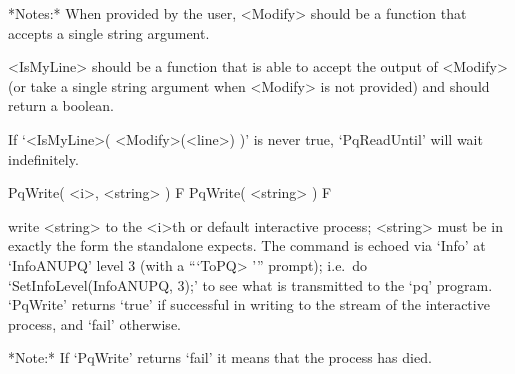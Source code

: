 *Notes:* 
When provided by the user, <Modify> should be a function that  accepts  a
single string argument.

<IsMyLine> should be a function that is able  to  accept  the  output  of
<Modify> (or take a single string argument when <Modify> is not provided)
and should return a boolean.

If `<IsMyLine>( <Modify>(<line>) )' is  never  true,  `PqReadUntil'  will
wait indefinitely.

\>PqWrite( <i>, <string> ) F
\>PqWrite( <string> ) F

write <string> to the <i>th  or  default  interactive  {\ANUPQ}  process;
<string> must be in exactly the form the {\ANUPQ} standalone expects. The
command is echoed via `Info' at `InfoANUPQ' level 3 (with a  ```ToPQ> '''
prompt); i.e.~do `SetInfoLevel(InfoANUPQ, 3);' to see what is transmitted
to the `pq' program. `PqWrite' returns `true' if successful in writing  to
the stream of the interactive {\ANUPQ} process, and `fail' otherwise.

*Note:*
If `PqWrite' returns `fail' it means that the {\ANUPQ} process has died.

